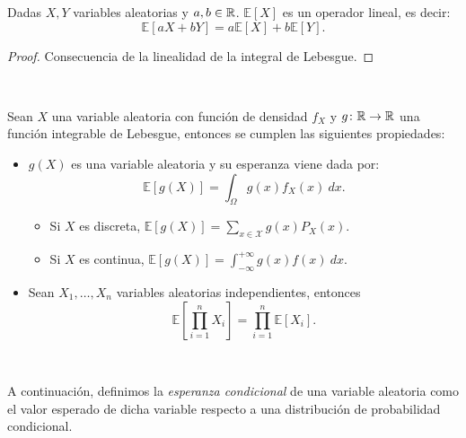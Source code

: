 \documentclass[oneside,openright,titlepage,numbers=noenddot,openany,headinclude,footinclude=true,
cleardoublepage=empty,abstractoff,BCOR=5mm,paper=a4,fontsize=12pt,main=spanish]{scrreprt}
\begin{document}
\begin{proposition}
Dadas $X,Y$ variables aleatorias y $a,b\in \mathbb{R}$. $\mathbb{E}[X]$ es un operador lineal, es decir: $$\mathbb{E}[aX+bY]=a\mathbb{E}[X]+b\mathbb{E}[Y].$$ 
\end{proposition}

\begin{proof}
Consecuencia de la linealidad de la integral de Lebesgue.
\end{proof}\

\begin{proposition}
Sean $X$ una variable aleatoria con función de densidad $f_X$ y $g\colon \mathbb{R} \to \mathbb{R}$ una función integrable de Lebesgue, entonces se cumplen las siguientes propiedades:
\begin{itemize}
    \item $g(X)$ es una variable aleatoria y su esperanza viene dada por: $$\mathbb{E}[g(X)]=\int_\Omega g(x)f_X(x) \ dx.$$ 
    \begin{itemize}
        \item Si $X$ es discreta, $\displaystyle \mathbb{E}[g(X)]=\sum_{x\in \mathcal{X}} g(x)P_X(x).$
        \item Si $X$ es continua, $\displaystyle \mathbb{E}[g(X)]=\int_{-\infty}^{+\infty}g(x) f(x) \ dx.$
    \end{itemize}
    \item Sean $X_1,\dots,X_n$ variables aleatorias independientes, entonces $$\mathbb{E}\left[\prod_{i=1}^n X_i \right]=\prod_{i=1}^n \mathbb{E}[X_i].$$
\end{itemize}
\end{proposition}\

A continuación, definimos la \textit{esperanza condicional} de una variable aleatoria como el valor esperado de dicha variable respecto a una distribución de probabilidad condicional.\\
\end{document}
